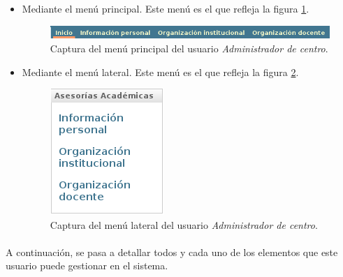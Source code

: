   \begin{itemize}
   \item Mediante el menú principal. Este menú es el que refleja la figura
   \ref{capturaMenuPrincipalAdminCentro}.

  \begin{figure}[!ht]
    \begin{center}
      \includegraphics[scale=0.55]{4.Funcionamiento_Aplicacion/4.3.Gestion/4.3.2.Administrador_Centro/4.3.2.1.Introduccion/menu_principal.png}
      \caption{Captura del menú principal del usuario \textit{Administrador de centro}.}
      \label{capturaMenuPrincipalAdminCentro}
    \end{center}
  \end{figure}

   \item Mediante el menú lateral. Este menú es el que refleja la figura
   \ref{capturaMenuLateralAdminCentro}.

   \begin{figure}[!ht]
    \begin{center}
      \includegraphics[scale=0.55]{4.Funcionamiento_Aplicacion/4.3.Gestion/4.3.2.Administrador_Centro/4.3.2.1.Introduccion/menu_lateral.png}
      \caption{Captura del menú lateral del usuario \textit{Administrador de centro}.}
      \label{capturaMenuLateralAdminCentro}
    \end{center}
  \end{figure}

  \end{itemize}

  \paragraph{}A continuación, se pasa a detallar todos y cada uno de los
  elementos que este usuario puede gestionar en el sistema.
